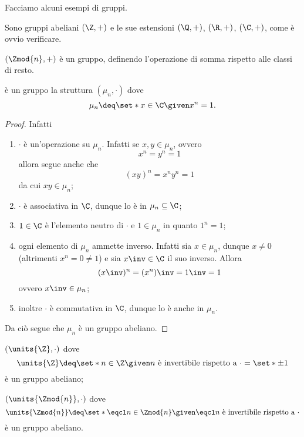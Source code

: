 Facciamo alcuni esempi di gruppi.
\begin{example}
    Sono gruppi abeliani $(\Z, +)$ e le sue estensioni $(\Q, +)$, $(\R, +)$, $(\C, +)$, come è ovvio verificare.
\end{example}
\begin{example}
    $(\Zmod{n}, +)$ è un gruppo, definendo l'operazione di somma rispetto alle classi di resto.
\end{example}
\begin{example}
    è un gruppo la struttura $(\mu_n, \cdot)$ dove \[
        \mu_n \deq \set*{x \in \C \given x^n = 1}.    
    \]
\end{example}
\begin{proof}
    Infatti \begin{enumerate}[label={(G\arabic*)}, start=0]
        \item $\cdot$ è un'operazione su $\mu_n$. Infatti se $x, y \in \mu_n$, ovvero \[
            x^n = y^n = 1    
        \] allora segue anche che \[
            (xy)^n = x^ny^n = 1    
        \] da cui $xy \in \mu_n$;
        \item $\cdot$ è associativa in $\C$, dunque lo è in $\mu_n \subseteq \C$;
        \item $1 \in \C$ è l'elemento neutro di $\cdot$ e $1 \in \mu_n$ in quanto $1^n = 1$;
        \item ogni elemento di $\mu_n$ ammette inverso. Infatti sia $x \in \mu_n$, dunque $x \neq 0$ (altrimenti $x^n = 0 \neq 1$) e sia $x\inv \in \C$ il suo inverso. Allora \[
            (x\inv)^n = (x^n)\inv = 1\inv = 1    
        \] ovvero $x\inv \in \mu_n$;
        \item inoltre $\cdot$ è commutativa in $\C$, dunque lo è anche in $\mu_n$.
    \end{enumerate}
    Da ciò segue che $\mu_n$ è un gruppo abeliano.
\end{proof}
\begin{example}
    $(\units{\Z}, \cdot)$ dove \[
        \units{\Z} \deq \set*{n \in \Z \given n \text{ è invertibile rispetto a } \cdot} = \set*{\pm 1}
    \] è un gruppo abeliano;
\end{example}
\begin{example}
    $(\units{\Zmod{n}}, \cdot)$ dove \[
        \units{\Zmod{n}} \deq \set*{\eqcl n \in \Zmod{n} \given \eqcl n \text{ è invertibile rispetto a } \cdot}
    \] è un gruppo abeliano.
\end{example}
